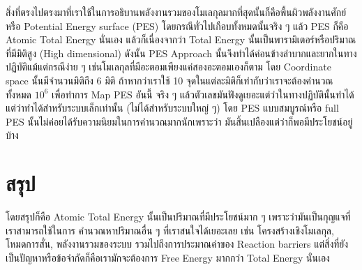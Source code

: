สิ่งที่ตรงไปตรงมาที่เราใช้ในการอธิบานพลังงานรวมของโมเลกุลมากที่สุดนั้นก็คือพื้นผิวพลังงานศักย์หรือ Potential Energy 
surface (PES) โดยกรณีทั่วไปเกือบทั้งหมดนั้นจริง ๆ แล้ว PES ก็คือ Atomic Total Energy นั่นเอง 
แล้วก็เนื่องจากว่า Total Energy นั้นเป็นพารามิเตอร์หรือปริมาณที่มีมิติสูง (High dimensional) ดังนั้น PES Approach 
นั้นจึงทำได้ค่อนข้างลำบากและยากในทางปฏิบัติแม้แต่กรณีง่าย ๆ เช่นโมเลกุลที่มีอะตอมเพียงแค่สองอะตอมเองก็ตาม 
โดย Coordinate space นั้นมีจำนวนมิติถึง 6 มิติ ถ้าหากว่าเราใช้ 10 จุดในแต่ละมิติก็เท่ากับว่าเราจะต้องคำนวณทั้งหมด 
$10^{6}$ เพื่อทำการ Map PES อันนี้ จริง ๆ แล้วตัวเลขมันฟังดูเยอะแต่ว่าในทางปฏิบัตินั้นทำได้แต่ว่าทำได้สำหรับระบบเล็กเท่านั้น 
(ไม่ได้สำหรับระบบใหญ่ ๆ) โดย PES แบบสมบูรณ์หรือ full PES นั้นไม่ค่อยได้รับความนิยมในการคำนวณมากนักเพราะว่า%
มันสิ้นเปลืองแต่ว่าก็พอมีประโยชน์อยู่บ้าง

\section{สรุป}

โดยสรุปก็คือ Atomic Total Energy นั้นเป็นปริมาณที่มีประโยชน์มาก ๆ เพราะว่ามันเป็นกุญแจที่เราสามารถใช้ในการ%
คำนวณหาปริมาณอื่น ๆ ที่เราสนใจได้เยอะเลย เช่น โครงสร้างเชิงโมเลกุล, โหมดการสั่น, พลังงานรวมของระบบ 
รวมไปถึงการประมาณค่าของ Reaction barriers แต่สิ่งที่ยังเป็นปัญหาหรือข้อจำกัดก็คือเรามักจะต้องการ Free Energy 
มากกว่า Total Energy นั่นเอง 
